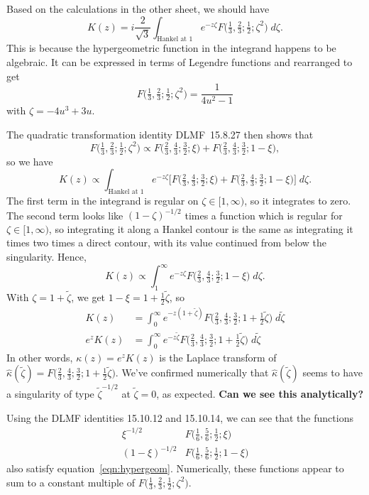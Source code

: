 \documentclass{article}
\begin{document}
Based on the calculations in the other sheet, we should have
\[ K(z) = i \frac{2}{\sqrt{3}} \int_{\text{Hankel at } 1} e^{-z\zeta} F\big(\tfrac{1}{3}, \tfrac{2}{3}; \tfrac{1}{2}; \zeta^2\big)\;d\zeta. \]
This is because the hypergeometric function in the integrand happens to be algebraic. It can be expressed in terms of Legendre functions and rearranged to get
\[ F\big(\tfrac{1}{3}, \tfrac{2}{3}; \tfrac{1}{2}; \zeta^2\big) = \frac{1}{4u^2 - 1} \]
with $\zeta = -4u^3 + 3u$.

The quadratic transformation identity DLMF~15.8.27 then shows that
\[ F\big(\tfrac{1}{3}, \tfrac{2}{3}; \tfrac{1}{2}; \zeta^2\big) \propto F\big(\tfrac{2}{3}, \tfrac{4}{3}; \tfrac{3}{2}; \xi\big) + F\big(\tfrac{2}{3}, \tfrac{4}{3}; \tfrac{3}{2}; 1-\xi\big), \]
so we have
\[ K(z) \propto \int_{\text{Hankel at } 1} e^{-z\zeta} \big[F\big(\tfrac{2}{3}, \tfrac{4}{3}; \tfrac{3}{2}; \xi\big) + F\big(\tfrac{2}{3}, \tfrac{4}{3}; \tfrac{3}{2}; 1-\xi\big)\big]\;d\zeta. \]
The first term in the integrand is regular on $\zeta \in [1, \infty)$, so it integrates to zero. The second term looks like $(1 - \zeta)^{-1/2}$ times a function which is regular for $\zeta \in [1, \infty)$, so integrating it along a Hankel contour is the same as integrating it times two times a direct contour, with its value continued from below the singularity. Hence,
\[ K(z) \propto \int^\infty_1 e^{-z\zeta} F\big(\tfrac{2}{3}, \tfrac{4}{3}; \tfrac{3}{2}; 1-\xi\big)\;d\zeta. \]
With $\zeta = 1 + \tilde{\zeta}$, we get $1 - \xi = 1 + \tfrac{1}{2} \tilde{\zeta}$, so
\begin{align*}
K(z) & = \int^\infty_0 e^{-z(1 + \tilde{\zeta})} F\big(\tfrac{2}{3}, \tfrac{4}{3}; \tfrac{3}{2}; 1 + \tfrac{1}{2}\tilde{\zeta}\big)\;d\tilde{\zeta} \\
e^z K(z) & = \int^\infty_0 e^{-z\tilde{\zeta}} F\big(\tfrac{2}{3}, \tfrac{4}{3}; \tfrac{3}{2}; 1 + \tfrac{1}{2}\tilde{\zeta}\big)\;d\tilde{\zeta}
\end{align*}
In other words, $\kappa(z) = e^z K(z)$ is the Laplace transform of $\hat{\kappa}(\tilde{\zeta}) = F\big(\tfrac{2}{3}, \tfrac{4}{3}; \tfrac{3}{2}; 1 + \tfrac{1}{2}\tilde{\zeta}\big)$. We've confirmed numerically that $\hat{\kappa}(\tilde{\zeta})$ seems to have a singularity of type $\tilde{\zeta}^{-1/2}$ at $\tilde{\zeta} = 0$, as expected. \textbf{Can we see this analytically?}

Using the DLMF identities 15.10.12 and 15.10.14, we can see that the functions
\begin{align*}
\xi^{-1/2} & F\big(\tfrac{1}{6}, \tfrac{5}{6}; \tfrac{1}{2}; \xi\big) \\
(1-\xi)^{-1/2} & F\big(\tfrac{1}{6}, \tfrac{5}{6}; \tfrac{1}{2}; 1-\xi\big)
\end{align*}
also satisfy equation~\ref{eqn:hypergeom}. Numerically, these functions appear to sum to a constant multiple of $F\big(\tfrac{1}{3}, \tfrac{2}{3}; \tfrac{1}{2}; \zeta^2\big)$.
\end{document}
